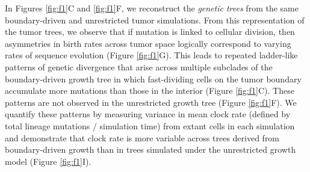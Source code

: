 \documentclass[12pt]{elife_based}
\begin{document}
In Figures \ref{fig:f1}C and \ref{fig:f1}F, we reconstruct the \textit{genetic trees} from the same boundary-driven and unrestricted tumor simulations. 
From this representation of the tumor trees, we observe that if mutation is linked to cellular division, then asymmetries in birth rates across tumor space logically correspond to varying rates of sequence evolution (Figure \ref{fig:f1}G). 
This leads to repeated ladder-like patterns of genetic divergence that arise across multiple subclades of the boundary-driven growth tree in which fast-dividing cells on the tumor boundary accumulate more mutations than those in the interior (Figure \ref{fig:f1}C). These patterns are not observed in the unrestricted growth tree (Figure \ref{fig:f1}F). We quantify these patterns by measuring variance in mean clock rate (defined by total lineage mutations / simulation time) from extant cells in each simulation and demonstrate that clock rate is more variable across trees derived from boundary-driven growth than in trees simulated under the unrestricted growth model (Figure \ref{fig:f1}I). 
\end{document}
